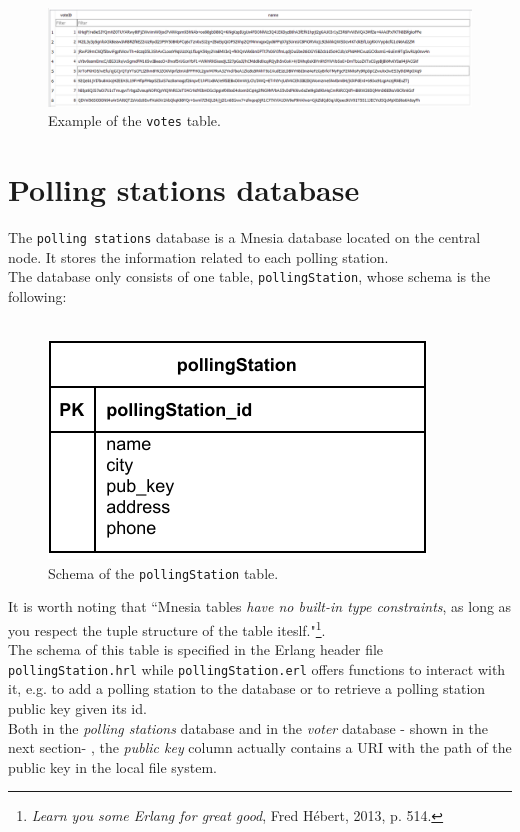 \begin{figure}[H]
    \begin{center}
        \includegraphics[scale=0.5]{img/votes_db_screen.png}
    \end{center}
    \vspace*{-0.5cm}
    \caption{Example of the \texttt{votes} table.}
    \label{fig:votes_db}
\end{figure}

\section{Polling stations database}\label{sec:polling_stations_db}
The \texttt{polling stations} database is a Mnesia database located on the central node. It stores the information related to each polling station.\\
The database only consists of one table, \texttt{pollingStation}, whose schema is the following:\\
\
\begin{figure}[H]
    \begin{center}
        \includegraphics[scale=1]{img/pollingstation_schema.pdf}
    \end{center}
    \vspace*{-0.5cm}
    \caption{Schema of the \texttt{pollingStation} table.}
    \label{fig:pollingstation_schema}
\end{figure}

It is worth noting that ``Mnesia tables \textit{have no built-in type constraints}, as long as you respect the tuple structure of the table iteslf."\footnote{\textit{Learn you some Erlang for great good}, Fred Hébert, 2013, p. 514.}.\\
The schema of this table is specified in the Erlang header file \texttt{pollingStation.hrl} while \texttt{pollingStation.erl} offers functions to interact with it, e.g. to add a polling station to the database or to retrieve a polling station public key given its id.\\
Both in the \textit{polling stations} database and in the \textit{voter} database - shown in the next section- , the \textit{public key} column actually contains a URI with the path of the public key in the local file system.\\

